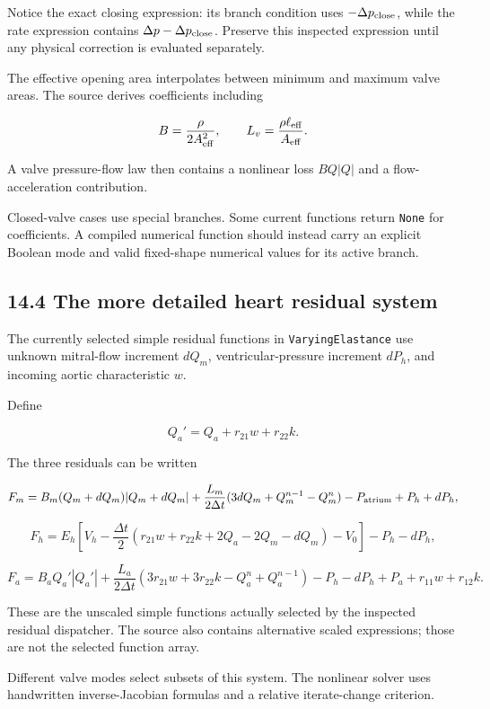 \documentclass[11pt,a4paper]{article}
\begin{document}
Notice the exact closing expression: its branch condition uses \(-\Delta p_{\rm close}\), while the rate expression contains \(\Delta p-\Delta p_{\rm close}\). Preserve this inspected expression until any physical correction is evaluated separately.

The effective opening area interpolates between minimum and maximum valve areas. The source derives coefficients including


\begingroup\small
\[
B=\frac{\rho}{2A_{\rm eff}^2},
\qquad
L_v=\frac{\rho\ell_{\rm eff}}{A_{\rm eff}}.
\]
\endgroup


A valve pressure-flow law then contains a nonlinear loss \(B Q|Q|\) and a flow-acceleration contribution.

Closed-valve cases use special branches. Some current functions return \texttt{None} for coefficients. A compiled numerical function should instead carry an explicit Boolean mode and valid fixed-shape numerical values for its active branch.

\subsection{14.4 The more detailed heart residual system}
The currently selected simple residual functions in \texttt{VaryingElastance} use unknown mitral-flow increment \(dQ_m\), ventricular-pressure increment \(dP_h\), and incoming aortic characteristic \(w\).

Define


\begingroup\small
\[
Q_a'=Q_a+r_{21}w+r_{22}k.
\]
\endgroup


The three residuals can be written


\begingroup\small
\[
F_m=
B_m(Q_m+dQ_m)|Q_m+dQ_m|
+\frac{L_m}{2\Delta t}(3dQ_m+Q_m^{n-1}-Q_m^n)
-P_{\rm atrium}+P_h+dP_h,
\]
\endgroup



\begingroup\small
\[
F_h=
E_h\left[
V_h-\frac{\Delta t}{2}
(r_{21}w+r_{22}k+2Q_a-2Q_m-dQ_m)-V_0
\right]-P_h-dP_h,
\]
\endgroup



\begingroup\small
\[
F_a=
B_aQ_a'|Q_a'|
+\frac{L_a}{2\Delta t}
(3r_{21}w+3r_{22}k-Q_a^n+Q_a^{n-1})
-P_h-dP_h+P_a+r_{11}w+r_{12}k.
\]
\endgroup


These are the unscaled simple functions actually selected by the inspected residual dispatcher. The source also contains alternative scaled expressions; those are not the selected function array.

Different valve modes select subsets of this system. The nonlinear solver uses handwritten inverse-Jacobian formulas and a relative iterate-change criterion.
\end{document}
